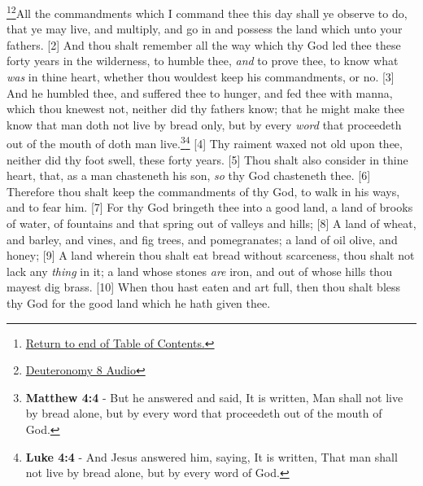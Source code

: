 \footnote{\textcolor[cmyk]{0.99998,1,0,0}{\hyperlink{TOC}{Return to end of Table of Contents.}}}\footnote{\href{https://audiobible.com/bible/deuteronomy_8.html}{\textcolor[cmyk]{0.99998,1,0,0}{Deuteronomy 8 Audio}}}\textcolor[cmyk]{0.99998,1,0,0}{All the commandments which I command thee this day shall ye observe to do, that ye may live, and multiply, and go in and possess the land which     unto your fathers.}
[2] \textcolor[cmyk]{0.99998,1,0,0}{And thou shalt remember all the way which    thy God led thee these forty years in the wilderness, to humble thee, \emph{and} to prove thee, to know what \emph{was} in thine heart, whether thou wouldest keep his commandments, or no.}
[3] \textcolor[cmyk]{0.99998,1,0,0}{And he humbled thee, and suffered thee to hunger, and fed thee with manna, which thou knewest not, neither did thy fathers know; that he might make thee know that man doth not live by bread only, but by every \emph{word} that proceedeth out of the mouth of    doth man live.}\footnote{\textbf{Matthew 4:4} - But he answered and said, It is written, Man shall not live by bread alone, but by every word that proceedeth out of the mouth of God.}\footnote{\textbf{Luke 4:4} - And Jesus answered him, saying, It is written, That man shall not live by bread alone, but by every word of God.}
[4] \textcolor[cmyk]{0.99998,1,0,0}{Thy raiment waxed not old upon thee, neither did thy foot swell, these forty years.}
[5] \textcolor[cmyk]{0.99998,1,0,0}{Thou shalt also consider in thine heart, that, as a man chasteneth his son, \emph{so}    thy God chasteneth thee.}
[6] \textcolor[cmyk]{0.99998,1,0,0}{Therefore thou shalt keep the commandments of    thy God, to walk in his ways, and to fear him.}
[7] \textcolor[cmyk]{0.99998,1,0,0}{For    thy God bringeth thee into a good land, a land of brooks of water, of fountains and  that spring out of valleys and hills;}
[8] \textcolor[cmyk]{0.99998,1,0,0}{A land of wheat, and barley, and vines, and fig trees, and pomegranates; a land of oil olive, and honey;}
[9] \textcolor[cmyk]{0.99998,1,0,0}{A land wherein thou shalt eat bread without scarceness, thou shalt not lack any \emph{thing} in it; a land whose stones \emph{are} iron, and out of whose hills thou mayest dig brass.}
[10] \textcolor[cmyk]{0.99998,1,0,0}{When thou hast eaten and art full, then thou shalt bless    thy God for the good land which he hath given thee.}
